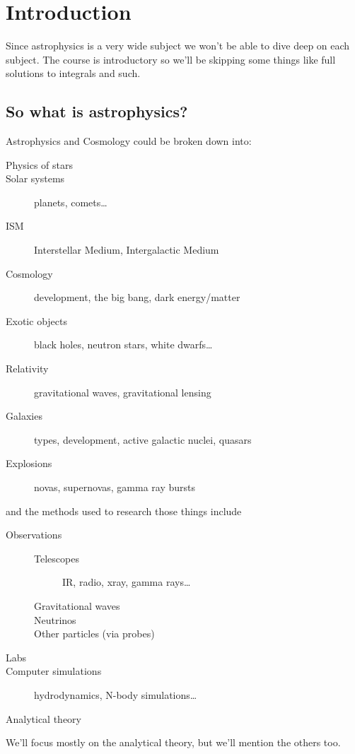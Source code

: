 \section{Introduction}

Since astrophysics is a very wide subject we won't be able to dive deep on each subject. The course is introductory so we'll be skipping some things like full solutions to integrals and such. 

\subsection{So what is astrophysics?}

Astrophysics and Cosmology could be broken down into:

\begin{description}
	\item[Physics of stars]
	\item[Solar systems] planets, comets\dots
	\item[ISM] Interstellar Medium, Intergalactic Medium
	\item[Cosmology] development, the big bang, dark energy/matter
	\item[Exotic objects] black holes, neutron stars, white dwarfs\dots
	\item[Relativity] gravitational waves, gravitational lensing
	\item[Galaxies] types, development, active galactic nuclei, quasars
	\item[Explosions] novas, supernovas, gamma ray bursts
\end{description}

and the methods used to research those things include

\begin{description}
	\item[Observations]\begin{minipage}[t][][t]{12cm}
		\begin{description} 
		\item[Telescopes] IR, radio, xray, gamma rays\dots
		\item[Gravitational waves]
		\item[Neutrinos]
		\item[Other particles (via probes)]
	\end{description}
	\end{minipage}
	\item[Labs]
	\item[Computer simulations] hydrodynamics, N-body simulations\dots
	\item[Analytical theory]
\end{description}

We'll focus mostly on the analytical theory, but we'll mention the others too.


